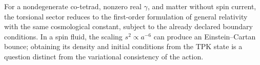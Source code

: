 For a nondegenerate co-tetrad, nonzero real \(\gamma\), and matter without spin current, the torsional sector reduces to the first-order formulation of general relativity with the same cosmological constant, subject to the already declared boundary conditions. In a spin fluid, the scaling \(s^2\propto a^{-6}\) can produce an Einstein--Cartan bounce; obtaining its density and initial conditions from the TPK state is a question distinct from the variational consistency of the action.
